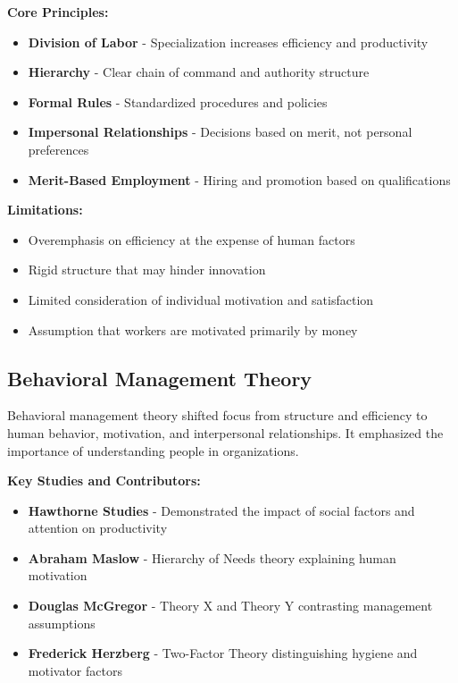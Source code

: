 \documentclass[12pt]{article}
\begin{document}
\textbf{Core Principles:}
\begin{itemize}
    \item \textbf{Division of Labor} - Specialization increases efficiency and productivity
    \item \textbf{Hierarchy} - Clear chain of command and authority structure
    \item \textbf{Formal Rules} - Standardized procedures and policies
    \item \textbf{Impersonal Relationships} - Decisions based on merit, not personal preferences
    \item \textbf{Merit-Based Employment} - Hiring and promotion based on qualifications
\end{itemize}

\textbf{Limitations:}
\begin{itemize}
    \item Overemphasis on efficiency at the expense of human factors
    \item Rigid structure that may hinder innovation
    \item Limited consideration of individual motivation and satisfaction
    \item Assumption that workers are motivated primarily by money
\end{itemize}

\subsection{Behavioral Management Theory}
Behavioral management theory shifted focus from structure and efficiency to human behavior, motivation, and interpersonal relationships. It emphasized the importance of understanding people in organizations.

\textbf{Key Studies and Contributors:}
\begin{itemize}
    \item \textbf{Hawthorne Studies} - Demonstrated the impact of social factors and attention on productivity
    \item \textbf{Abraham Maslow} - Hierarchy of Needs theory explaining human motivation
    \item \textbf{Douglas McGregor} - Theory X and Theory Y contrasting management assumptions
    \item \textbf{Frederick Herzberg} - Two-Factor Theory distinguishing hygiene and motivator factors
\end{itemize}
\end{document}
